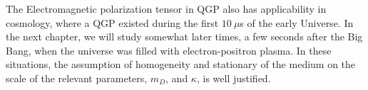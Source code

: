 The Electromagnetic polarization tensor in QGP also has applicability in cosmology, where a QGP existed during the first $10~\mu$s of the early Universe. In the next chapter, we will study somewhat later times, a few seconds after the Big Bang, when the universe was filled with electron-positron plasma. In these situations, the assumption of homogeneity and stationary of the medium on the scale of the relevant parameters, $m_D$, and $\kappa$, is well justified.








